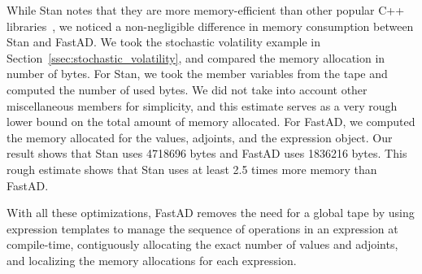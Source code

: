 While Stan notes that they are more memory-efficient than other popular C++ libraries~\cite{carpenter:2015},
we noticed a non-negligible difference in memory consumption between Stan and FastAD.
We took the stochastic volatility example in Section~\ref{ssec:stochastic_volatility},
and compared the memory allocation in number of bytes.
For Stan, we took the member variables
from the tape and computed the number of used bytes.
We did not take into account other miscellaneous members for simplicity,
and this estimate serves as a very rough lower bound on the total amount of memory allocated.
For FastAD, we computed the memory allocated for the values, adjoints, and the expression object.
Our result shows that Stan uses 4718696 bytes and FastAD uses 1836216 bytes.
This rough estimate shows that Stan uses at least 2.5 times more memory than FastAD.

With all these optimizations, FastAD removes the need for a global tape by 
using expression templates to manage the sequence of operations in an expression at compile-time,
contiguously allocating the exact number of values and adjoints,
and localizing the memory allocations for each expression.
